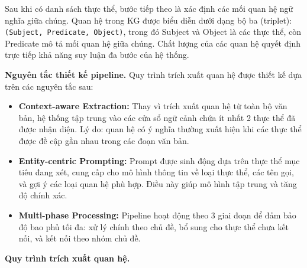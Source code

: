 Sau khi có danh sách thực thể, bước tiếp theo là xác định các mối quan hệ ngữ nghĩa giữa chúng. Quan hệ trong KG được biểu diễn dưới dạng bộ ba (triplet): \texttt{(Subject, Predicate, Object)}, trong đó Subject và Object là các thực thể, còn Predicate mô tả mối quan hệ giữa chúng. Chất lượng của các quan hệ quyết định trực tiếp khả năng suy luận đa bước của hệ thống.

\vspace{0.5em}
\noindent\textbf{Nguyên tắc thiết kế pipeline.}
Quy trình trích xuất quan hệ được thiết kế dựa trên các nguyên tắc sau:

\begin{itemize}
    \item \textbf{Context-aware Extraction:} Thay vì trích xuất quan hệ từ toàn bộ văn bản, hệ thống tập trung vào các cửa sổ ngữ cảnh chứa ít nhất 2 thực thể đã được nhận diện. Lý do: quan hệ có ý nghĩa thường xuất hiện khi các thực thể được đề cập gần nhau trong các đoạn văn bản.
    
    \item \textbf{Entity-centric Prompting:} Prompt được sinh động dựa trên thực thể mục tiêu đang xét, cung cấp cho mô hình thông tin về loại thực thể, các tên gọi, và gợi ý các loại quan hệ phù hợp. Điều này giúp mô hình tập trung và tăng độ chính xác.
    
    \item \textbf{Multi-phase Processing:} Pipeline hoạt động theo 3 giai đoạn để đảm bảo độ bao phủ tối đa: xử lý chính theo chủ đề, bổ sung cho thực thể chưa kết nối, và kết nối theo nhóm chủ đề.
\end{itemize}

\vspace{0.5em}
\noindent\textbf{Quy trình trích xuất quan hệ.}

